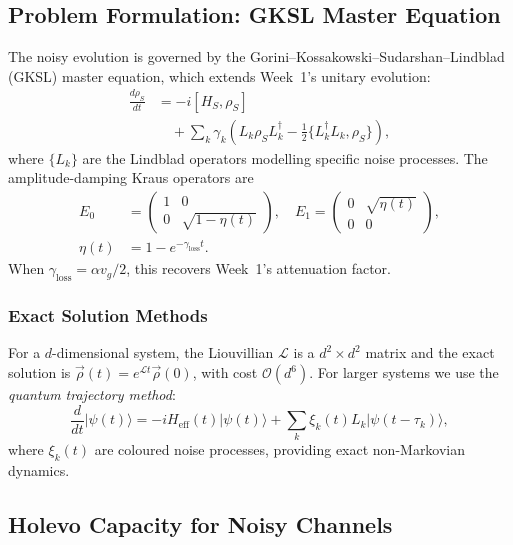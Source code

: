 \documentclass[journal,twocolumn]{IEEEtran}
\theoremstyle{definition}
\theoremstyle{plain}
\begin{document}
\subsection{Problem Formulation: GKSL Master Equation}
\label{sec:week2_problem}

The noisy evolution is governed by the
Gorini--Kossakowski--Sudarshan--Lindblad (GKSL) master equation, which
extends Week~1's unitary evolution:
\begin{align}
  \frac{d\rho_S}{dt} &= -i[H_S,\rho_S]\nonumber\\
  &\quad+\sum_k\gamma_k\!\left(L_k\rho_S L_k^\dagger
  -\tfrac{1}{2}\{L_k^\dagger L_k,\rho_S\}\right),
  \label{eq:GKSL}
\end{align}
where $\{L_k\}$ are the Lindblad operators modelling specific noise
processes. The amplitude-damping Kraus operators are
\begin{align}
  E_0 &= \begin{pmatrix}1&0\\0&\sqrt{1-\eta(t)}\end{pmatrix},\quad
  E_1 = \begin{pmatrix}0&\sqrt{\eta(t)}\\0&0\end{pmatrix},\nonumber\\
  \eta(t) &= 1-e^{-\gamma_{\mathrm{loss}}t}.
\end{align}
When $\gamma_{\mathrm{loss}}=\alpha v_g/2$, this recovers Week~1's
attenuation factor.

\subsubsection{Exact Solution Methods}

For a $d$-dimensional system, the Liouvillian $\mathcal{L}$ is a
$d^2\times d^2$ matrix and the exact solution is
$\vec\rho(t)=e^{\mathcal{L}t}\vec\rho(0)$, with cost
$\mathcal{O}(d^6)$. For larger systems we use the \emph{quantum
trajectory method}:
\begin{equation}
  \frac{d}{dt}|\psi(t)\rangle=-iH_{\mathrm{eff}}(t)|\psi(t)\rangle
  +\sum_k\xi_k(t)L_k|\psi(t-\tau_k)\rangle,
\end{equation}
where $\xi_k(t)$ are coloured noise processes, providing exact
non-Markovian dynamics.

\subsection{Holevo Capacity for Noisy Channels}
\end{document}
